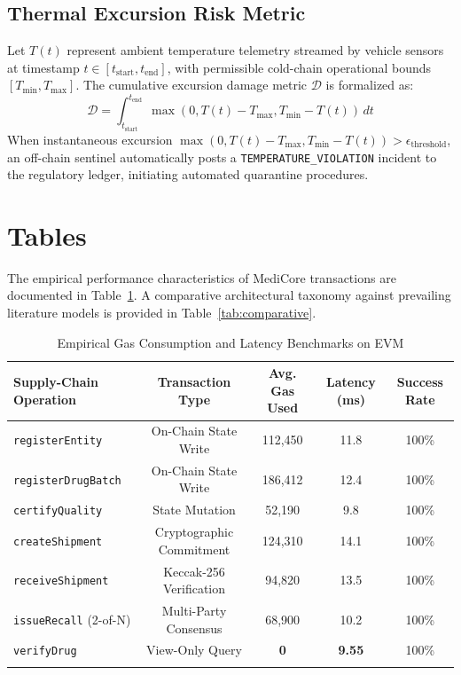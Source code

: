 \documentclass[pdflatex,sn-mathphys-num]{sn-jnl}
\theoremstyle{thmstyleone}
\theoremstyle{thmstyletwo}
\theoremstyle{thmstylethree}
\begin{document}
\subsection{Thermal Excursion Risk Metric}\label{sec4.3}
Let $T(t)$ represent ambient temperature telemetry streamed by vehicle sensors at timestamp $t \in [t_{\text{start}}, t_{\text{end}}]$, with permissible cold-chain operational bounds $[T_{\min}, T_{\max}]$. The cumulative excursion damage metric $\mathcal{D}$ is formalized as:
\begin{equation}
\mathcal{D} = \int_{t_{\text{start}}}^{t_{\text{end}}} \max\left(0, T(t) - T_{\max}, T_{\min} - T(t)\right) \, dt
\label{eq:thermal}
\end{equation}
When instantaneous excursion $\max(0, T(t) - T_{\max}, T_{\min} - T(t)) > \epsilon_{\text{threshold}}$, an off-chain sentinel automatically posts a \texttt{TEMPERATURE\_VIOLATION} incident to the regulatory ledger, initiating automated quarantine procedures.

\section{Tables}\label{sec5}

The empirical performance characteristics of MediCore transactions are documented in Table~\ref{tab:benchmarks}. A comparative architectural taxonomy against prevailing literature models is provided in Table~\ref{tab:comparative}.

\begin{table}[ht]
\caption{Empirical Gas Consumption and Latency Benchmarks on EVM}\label{tab:benchmarks}%
\begin{tabular*}{\textwidth}{@{\extracolsep\fill}lcccc@{\extracolsep\fill}}
\toprule
Supply-Chain Operation & Transaction Type & Avg. Gas Used & Latency (ms) & Success Rate \\
\midrule
\texttt{registerEntity} & On-Chain State Write & 112,450 & 11.8 & 100\% \\
\texttt{registerDrugBatch} & On-Chain State Write & 186,412 & 12.4 & 100\% \\
\texttt{certifyQuality} & State Mutation & 52,190 & 9.8 & 100\% \\
\texttt{createShipment} & Cryptographic Commitment & 124,310 & 14.1 & 100\% \\
\texttt{receiveShipment} & Keccak-256 Verification & 94,820 & 13.5 & 100\% \\
\texttt{issueRecall} (2-of-N) & Multi-Party Consensus & 68,900 & 10.2 & 100\% \\
\texttt{verifyDrug} & View-Only Query & \textbf{0} & \textbf{9.55} & 100\% \\
\botrule
\end{tabular*}
\end{table}
\end{document}
